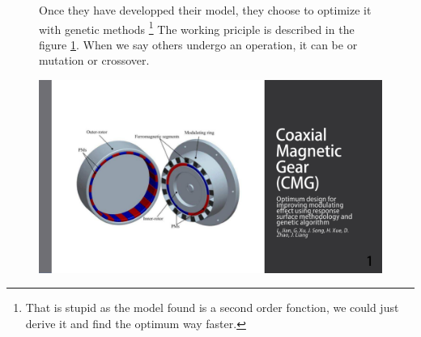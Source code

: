 \begin{figure}[H]
    \begin{minipage}{.45\linewidth}
    Once they have developped their model, they choose to optimize it with genetic methods \footnote{That is stupid as the model found is a second order fonction, we could just derive it and find the optimum way faster.}
    The working priciple is described in the figure \ref{fig:61_th slide}. When we say others undergo an operation, it can be or mutation or crossover.
    \end{minipage}
    \hfill%
    \begin{minipage}[c]{.53\linewidth}
        \centering
        \includegraphics[page={61},width=\textwidth]{LELEC2311.allow.pdf}
        \caption{}
        \label{fig:61_th slide}
    \end{minipage}
\end{figure}

